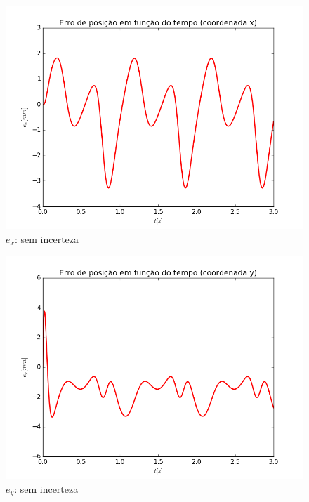 \documentclass[]{politex}
\begin{document}
\begin{multicols}{2}
\begin{figure}[H]
	\centering
	\includegraphics[scale=0.42]{imagens/ex_0.png}  
	\caption{$e_x$: sem incerteza}
	\label{fig:ex_0}
\end{figure}
\begin{figure}[H]
	\centering
	\includegraphics[scale=0.42]{imagens/ey_0.png}  
	\caption{$e_y$: sem incerteza}
	\label{fig:ey_0}
\end{figure}
\end{multicols}
\end{document}
